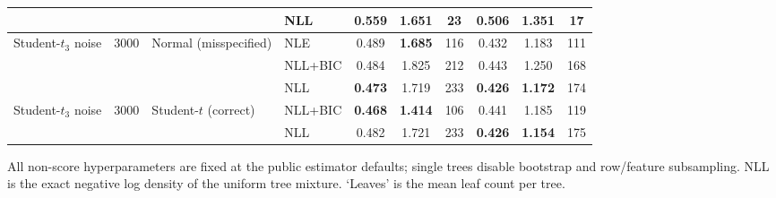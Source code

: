 \begin{table}[!p]
{\begin{tabular}{llllcccccc}
 & & & NLL & \textbf{0.559} & \textbf{1.651} & 23 & \textbf{0.506} & 1.351 & 17 \\
\midrule
Student-$t_3$ noise & 3000 & Normal (misspecified) & NLE & 0.489 & \textbf{1.685} & 116 & 0.432 & 1.183 & 111 \\
 & & & NLL+BIC & 0.484 & 1.825 & 212 & 0.443 & 1.250 & 168 \\
 & & & NLL & \textbf{0.473} & 1.719 & 233 & \textbf{0.426} & \textbf{1.172} & 174 \\
Student-$t_3$ noise & 3000 & Student-$t$ (correct) & NLL+BIC & \textbf{0.468} & \textbf{1.414} & 106 & 0.441 & 1.185 & 119 \\
 & & & NLL & 0.482 & 1.721 & 233 & \textbf{0.426} & \textbf{1.154} & 175 \\
\bottomrule
\end{tabular}%
}
\par\smallskip\footnotesize{All non-score hyperparameters are fixed at the public estimator defaults; single trees disable bootstrap and row/feature subsampling. NLL is the exact negative log density of the uniform tree mixture. `Leaves' is the mean leaf count per tree.}
\end{table}
